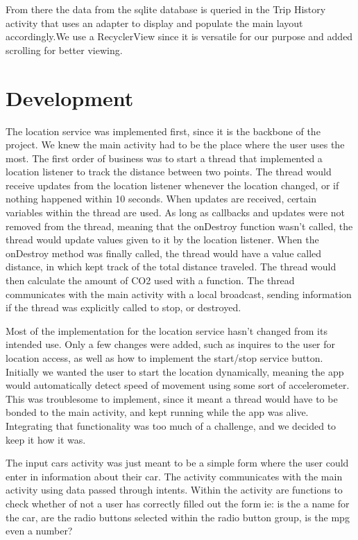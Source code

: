 \documentclass[twoside,twocolumn]{article}
\begin{document}
From there the data from the sqlite database is queried in the Trip History activity that uses an adapter to display and populate the main layout accordingly.We use a RecyclerView since it is versatile for our purpose and added scrolling for better viewing.


\section{Development}

The location service was implemented first, since it is the backbone of the project. We knew the main activity had to be the place where the user uses the most. The first order of business was to start a thread that implemented a location listener to track the distance between two points. The thread would receive updates from the location listener whenever the location changed, or if nothing happened within 10 seconds. When updates are received, certain variables within the thread are used. As long as callbacks and updates were not removed from the thread, meaning that the onDestroy function wasn't called, the thread would update values given to it by the location listener. When the onDestroy method was finally called, the thread would have a value called distance, in which kept track of the total distance traveled. The thread would then calculate the amount of CO2 used with a function. The thread communicates with the main activity with a local broadcast, sending information if the thread was explicitly called to stop, or destroyed.

Most of the implementation for the location service hasn't changed from its intended use. Only a few changes were added, such as inquires to the user for location access, as well as how to implement the start/stop service button. Initially we wanted the user to start the location dynamically, meaning the app would automatically detect speed of movement using some sort of accelerometer. This was troublesome to implement, since it meant a thread would have to be bonded to the main activity, and kept running while the app was alive. Integrating that functionality was too much of a challenge, and we decided to keep it how it was.

The input cars activity was just meant to be a simple form where the user could enter in information about their car. The activity communicates with the main activity using data passed through intents. Within the activity are functions to check whether of not a user has correctly filled out the form ie: is the a name for the car, are the radio buttons selected within the radio button group, is the mpg even a number?
\end{document}
